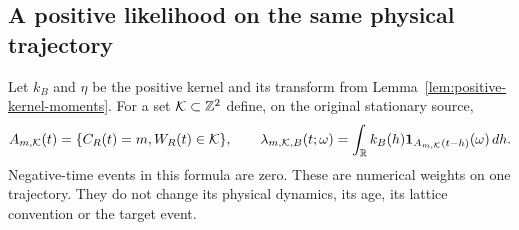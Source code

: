 \subsection{A positive likelihood on the same physical trajectory}
Let $k_B$ and $\eta$ be the positive kernel and its transform from
Lemma~\ref{lem:positive-kernel-moments}. For a set
$\mathcal K\subset\mathbb Z^2$ define, on the original stationary source,
\begin{equation}\label{eq:physical-time-positive-likelihood}
 A_{m,\mathcal K}(t)=\{C_R(t)=m,W_R(t)\in\mathcal K\},\qquad
 \lambda_{m,\mathcal K,B}(t;\omega)
   =\int_\R k_B(h)\one_{A_{m,\mathcal K}(t-h)}(\omega)\,dh.
\end{equation}
Negative-time events in this formula are zero. These are numerical
weights on one trajectory. They do not change its physical dynamics,
its age, its lattice convention or the target event.

